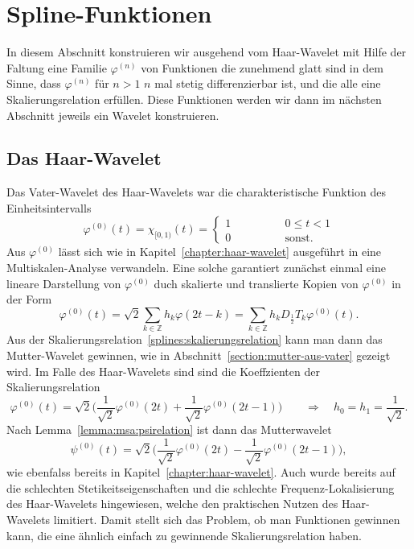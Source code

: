 %
%
%
\section{Spline-Funktionen
\label{section:spline-funktionen}}
In diesem Abschnitt konstruieren wir ausgehend vom Haar-Wavelet mit Hilfe
der Faltung eine Familie $\varphi^{(n)}$ von Funktionen die zunehmend glatt
sind in dem Sinne, dass $\varphi^{(n)}$ für $n>1$ $n$ mal stetig
differenzierbar ist, und die alle eine Skalierungsrelation erfüllen.
Diese Funktionen werden wir dann im nächsten Abschnitt jeweils ein
Wavelet konstruieren.

\subsection{Das Haar-Wavelet
\label{subsection:spline:haar}}
Das Vater-Wavelet des Haar-Wavelets war die charakteristische Funktion
des Einheitsintervalls
\begin{equation}
\varphi^{(0)}(t)
=
\chi_{[0,1)}(t)
=
\begin{cases}
1\qquad\qquad&0\le t < 1\\
0\qquad\qquad&\text{sonst}.
\end{cases}
\end{equation}
Aus $\varphi^{(0)}$ lässt sich wie in Kapitel~\ref{chapter:haar-wavelet}
ausgeführt in eine Multiskalen-Analyse verwandeln.
Eine solche garantiert zunächst einmal eine lineare Darstellung von
$\varphi^{(0)}$ duch skalierte und translierte Kopien von $\varphi^{(0)}$
in der Form
\begin{equation}
\varphi^{(0)}(t)
=
\sqrt{2}
\sum_{k\in\mathbb Z}
h_k\varphi(2t-k)
=
\sum_{k\in\mathbb Z}
h_k D_{\frac12}T_k\varphi^{(0)}(t).
\label{splines:skalierungsrelation}
\end{equation}
Aus der Skalierungsrelation~\eqref{splines:skalierungsrelation}
kann man dann das Mutter-Wavelet gewinnen, wie in
Abschnitt~\ref{section:mutter-aus-vater} gezeigt wird.
Im Falle des Haar-Wavelets sind sind die Koeffzienten der
Skalierungsrelation
\[
\varphi^{(0)}(t)
=
\sqrt{2}
\biggl(
\frac1{\sqrt{2}}
\varphi^{(0)}(2t)
+
\frac1{\sqrt{2}}
\varphi^{(0)}(2t-1)
\biggr)
\qquad
\Rightarrow
\quad
h_0 = h_1 = \frac{1}{\sqrt{2}}.
\]
Nach Lemma~\ref{lemma:msa:psirelation} ist dann das Mutterwavelet
\[
\psi^{(0)}(t)
=
\sqrt{2}
\biggl(
\frac{1}{\sqrt{2}}
\varphi^{(0)}(2t)
-
\frac{1}{\sqrt{2}}
\varphi^{(0)}(2t-1)
\biggr),
\]
wie ebenfalss bereits in Kapitel~\ref{chapter:haar-wavelet}.
Auch wurde bereits auf die schlechten Stetikeitseigenschaften und
die schlechte Frequenz-Lokalisierung des Haar-Wavelets hingewiesen,
welche den praktischen Nutzen des Haar-Wavelets limitiert.
Damit stellt sich das Problem, ob man Funktionen gewinnen kann, die
eine ähnlich einfach zu gewinnende Skalierungsrelation haben.

